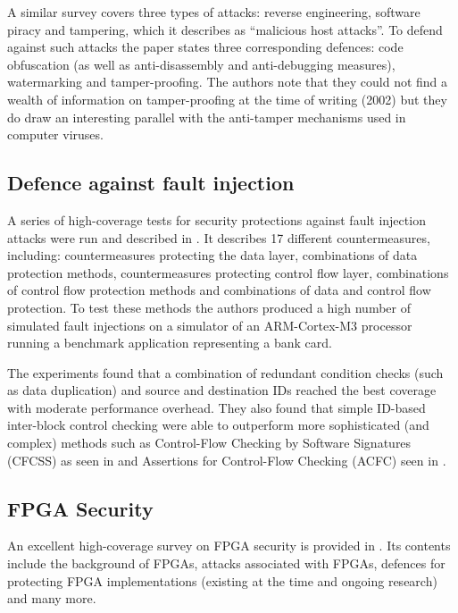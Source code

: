 A similar survey \cite{Collberg2002} covers three types of attacks: reverse engineering, software piracy and tampering, which it describes as ``malicious host attacks''. To defend against such attacks the paper states three corresponding defences: code obfuscation (as well as anti-disassembly and anti-debugging measures), watermarking and tamper-proofing. The authors note that they could not find a wealth of information on tamper-proofing at the time of writing (2002) but they do draw an interesting parallel with the anti-tamper mechanisms used in computer viruses.  

\subsection{Defence against fault injection}\label{faultInjectionDefenceSurveys}

A series of high-coverage tests for security protections against fault injection attacks were run and described in \cite{Theissing2013}. It describes 17 different countermeasures, including: countermeasures protecting the data layer, combinations of data protection methods, countermeasures protecting control flow layer, combinations of control flow protection methods and combinations of data and control flow protection. To test these methods the authors produced a high number of simulated fault injections on a simulator of an ARM-Cortex-M3 processor running a benchmark application representing a bank card.

The experiments found that a combination of redundant condition checks (such as data duplication) and source and destination IDs reached the best coverage with moderate performance overhead. They also found that simple ID-based inter-block control checking were able to outperform more sophisticated (and complex) methods such as Control-Flow Checking by Software Signatures (CFCSS) as seen in \cite{Werner2016} and Assertions for Control-Flow Checking (ACFC) seen in \cite{Goloubeva2003}.

\subsection{FPGA Security}

An excellent high-coverage survey on FPGA security is provided in \cite{Drimer2008}. Its contents include the background of FPGAs, attacks associated with FPGAs, defences for protecting FPGA implementations (existing at the time and ongoing research) and many more. 

